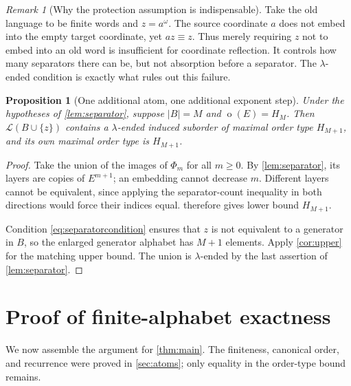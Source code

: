 \documentclass[11pt,letterpaper]{article}
\newtheorem{proposition}[proposition]{Proposition}
\theoremstyle{definition}
\theoremstyle{remark}
\newtheorem{remark}[remark]{Remark}
\newcommand{\Lcal}{\mathcal L}
\newcommand{\otp}{\operatorname{o}}
\begin{document}
\begin{remark}[Why the protection assumption is indispensable]
Take the old language to be finite words and $z=a^\omega$. The source
coordinate $a$ does not embed into the empty target coordinate, yet
$a z\equiv z$. Thus merely requiring $z$ not to embed into an old word
is insufficient for coordinate reflection. It controls how many
separators there can be, but not absorption before a separator.
The $\lambda$-ended condition is exactly what rules out this failure.
\end{remark}

\begin{proposition}[One additional atom, one additional exponent step]
\label{prop:amplification}
Under the hypotheses of \cref{lem:separator}, suppose $|B|=M$ and
$\otp(E)=H_M$. Then $\Lcal(B\cup\{z\})$ contains a $\lambda$-ended induced
suborder of maximal order type $H_{M+1}$, and its own maximal order type
is $H_{M+1}$.
\end{proposition}

\begin{proof}
Take the union of the images of $\Phi_m$ for all $m\ge0$.
By \cref{lem:separator}, its layers are copies of $E^{m+1}$; an embedding
cannot decrease $m$. Different layers cannot be equivalent, since
applying the separator-count inequality in both directions would force
their indices equal.  therefore gives lower bound
$H_{M+1}$.

Condition \eqref{eq:separatorcondition} ensures that $z$ is not equivalent
to a generator in $B$, so the enlarged generator alphabet has $M+1$
elements. Apply \cref{cor:upper} for the matching upper bound. The union
is $\lambda$-ended by the last assertion of \cref{lem:separator}.
\end{proof}

\section{Proof of finite-alphabet exactness}\label{sec:mainproof}

We now assemble the argument for \cref{thm:main}.
The finiteness, canonical order, and recurrence were proved in
\cref{sec:atoms}; only equality in the order-type bound remains.
\end{document}
